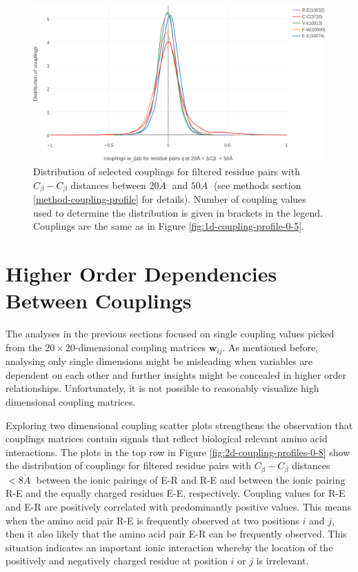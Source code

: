 \documentclass[12pt,a4paper,twoside]{book}
\newcommand{\Cb}{C_\beta}
\newcommand{\wij}{\mathbf{w}_{ij}}
\newcommand{\angstrom}{\mathring{A} \;}
\theoremstyle{definition}
\theoremstyle{definition}
\theoremstyle{remark}
\begin{document}
\begin{figure}
\includegraphics[width=1\linewidth]{img/coupling_matrix_analysis/1d_coupling_profile_20_50} \caption{Distribution of selected
couplings for filtered residue pairs with \(\Cb-\Cb\) distances between
\(20\angstrom\) and \(50\angstrom\) (see methods section
\ref{method-coupling-profile} for details). Number of coupling values
used to determine the distribution is given in brackets in the legend.
Couplings are the same as in Figure \ref{fig:1d-coupling-profile-0-5}.}\label{fig:1d-coupling-profile-20-50}
\end{figure}

\section{Higher Order Dependencies Between
Couplings}\label{higher-order-dependencies-between-couplings}

The analyses in the previous sections focused on single coupling values
picked from the \(20 \times 20\)-dimensional coupling matrices \(\wij\).
As mentioned before, analysing only single dimensions might be
misleading when variables are dependent on each other and further
insights might be concealed in higher order relationships.
Unfortunately, it is not possible to reasonably visualize high
dimensional coupling matrices.

Exploring two dimensional coupling scatter plots strengthens the
observation that couplings matrices contain signals that reflect
biological relevant amino acid interactions. The plots in the top row in
Figure \ref{fig:2d-coupling-profiles-0-8} show the distribution of
couplings for filtered residue pairs with \(\Cb-\Cb\) distances
\(< 8\angstrom\) between the ionic pairings of E-R and R-E and between
the ionic pairing R-E and the equally charged residues E-E,
respectively. Coupling values for R-E and E-R are positively correlated
with predominantly positive values. This means when the amino acid pair
R-E is frequently observed at two positions \(i\) and \(j\), then it
also likely that the amino acid pair E-R can be frequently observed.
This situation indicates an important ionic interaction whereby the
location of the positively and negatively charged residue at position
\(i\) or \(j\) is irrelevant.
\end{document}
